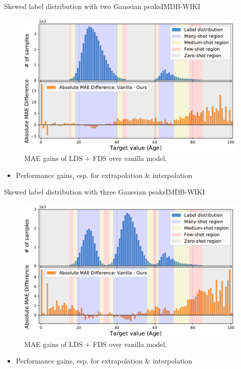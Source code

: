 \begin{frame}{Skewed label distribution with two Gaussian peaks}{IMDB-WIKI}
	\begin{figure}[h]
		\includegraphics[width=0.7\linewidth]{images/interp_extrap_diff_peak2.pdf}
		\caption{MAE gains of LDS + FDS over vanilla model.}
	\end{figure}
	\begin{itemize}
		\item Performance gains, esp. for extrapolation \& interpolation
	\end{itemize}
\end{frame}

\begin{frame}{Skewed label distribution with three Gaussian peaks}{IMDB-WIKI}
	\begin{figure}[h]
		\includegraphics[width=0.7\linewidth]{images/interp_extrap_diff_peak3.pdf}
		\caption{MAE gains of LDS + FDS over vanilla model.}
	\end{figure}
	\begin{itemize}
		\item Performance gains, esp. for extrapolation \& interpolation
	\end{itemize}
\end{frame}

